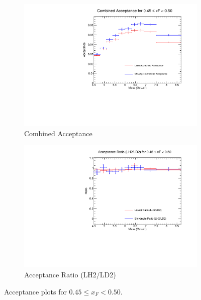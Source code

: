 \documentclass[11pt]{article}
\begin{document}
\begin{figure}[p]
\begin{subfigure}[b]{0.48\textwidth}
       \includegraphics[width=\linewidth]{./acceptancePlots/Combined_acceptance_xF_bin_9.pdf}
       \caption{Combined Acceptance}
    \end{subfigure}\hfill
    \begin{subfigure}[b]{0.48\textwidth}
       \includegraphics[width=\linewidth]{./acceptancePlots/Acceptance_ratio_xF_bin_9.pdf}
       \caption{Acceptance Ratio (LH2/LD2)}
    \end{subfigure}
    \caption{Acceptance plots for $0.45 \le x_F < 0.50$.}
\end{figure}
\end{document}
